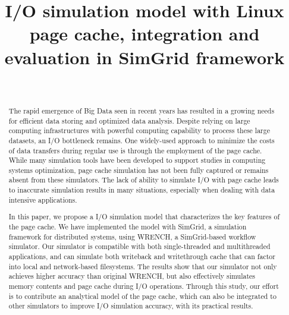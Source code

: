 \documentclass[conference]{IEEEtran}
\begin{document}
\title{I/O simulation model with Linux page cache, integration and evaluation in SimGrid framework}

\author{\\
}

\maketitle

	\begin{abstract}
		
		The rapid emergence of Big Data seen in recent years has resulted in a 
		growing needs for efficient data storing and optimized data analysis. 
		Despite relying on large computing infrastructures with powerful computing capability 
		to process these large datasets, an I/O bottleneck remains. 
        One widely-used approach to minimize the costs of data transfers during
        regular use is through the employment of the page cache.
		While many simulation tools have been developed to 
		support studies in computing systems optimization, page cache simulation 
		has not been fully captured or remains absent from these simulators. 
		The lack of ability to simulate I/O with page cache leads to inaccurate 
		simulation results in many situations, especially when dealing with data intensive applications. 
		
		In this paper, we propose a I/O simulation model that characterizes the key features of the page cache.
		We have implemented the model with SimGrid, a simulation framework for 
		distributed systems, using WRENCH, a SimGrid-based workflow simulator. 
        Our simulator is compatible with both single-threaded and multithreaded applications,
        and can simulate both writeback and writethrough cache that can factor into local
        and network-based filesystems.
		The results show that our simulator not only achieves higher accuracy than 
		original WRENCH, but also effectively simulates memory contents and 
		page cache during I/O operations. 
		Through this study, our effort is to contribute an analytical model 
		of the page cache, which can also be integrated to other simulators 
		to improve I/O simulation accuracy, with its practical results. 
		
	\end{abstract}		 
\end{document}
